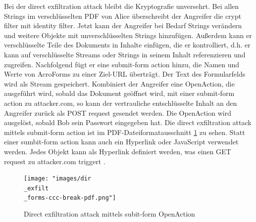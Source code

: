 Bei der direct exfiltration attack bleibt die Kryptografie unversehrt. Bei allen Strings im verschlüsselten PDF von Alice überschreibt der Angreifer die crypt filter mit identity filter. Jetzt kann der Angreifer bei Bedarf Strings verändern und weitere Objekte mit unverschlüsselten Strings hinzufügen. Außerdem kann er verschlüsselte Teile des Dokuments in Inhalte einfügen, die er kontrolliert, d.h. er kann auf verschlüsselte Streams oder Strings in seinem Inhalt referenzieren und zugreifen. Nachfolgend fügt er eine submit-form action hinzu, die Namen und Werte von AcroForms zu einer Ziel-URL überträgt. Der Text des Formularfelds wird als Stream gespeichert. Kombiniert der Angreifer eine OpenAction, die ausgeführt wird, sobald das Dokument geöffnet wird, mit einer submit-form action zu attacker.com, so kann der vertrauliche entschlüsselte Inhalt an den Angreifer zurück als POST request gesendet werden. Die OpenAction wird ausgelöst, sobald Bob sein Passwort eingegeben hat. Die direct exfiltration attack mittels submit-form action ist im PDF-Dateiformatausschnitt \ref{fig:dir-exfil} zu sehen. Statt einer sumbit-form action kann auch ein Hyperlink oder JavaScript verwendet werden. Jedes Objekt kann als Hyperlink definiert werden, was einen GET request zu attacker.com triggert \cite{ccc-break-pdf, pdfex}. 

\begin{figure}[!htbp]
	\centering
	\texttt{[image: "images/dir\\\_exfilt\\\_forms-ccc-break-pdf.png"]}
	\caption{Direct exfiltration attack mittels subit-form OpenAction \cite{ccc-break-pdf}}
	\label{fig:dir-exfil}
\end{figure}

